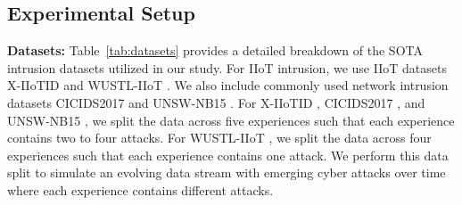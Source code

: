\subsection{Experimental Setup}
\label{section:experimental_setup}
\textbf{Datasets:} Table~\ref{tab:datasets} provides a detailed breakdown of the SOTA intrusion datasets utilized in our study. 
For IIoT intrusion, we use IIoT datasets X-IIoTID \cite{al2021x} and WUSTL-IIoT \cite{zolanvari2021wustl}. We also include commonly used network intrusion datasets CICIDS2017 \cite{Sharafaldin2018TowardGA} and UNSW-NB15 \cite{moustafa2015unsw}. For X-IIoTID \cite{al2021x}, CICIDS2017 \cite{Sharafaldin2018TowardGA}, and UNSW-NB15 \cite{moustafa2015unsw}, we split the data across five experiences such that each experience contains two to four attacks. For WUSTL-IIoT \cite{zolanvari2021wustl}, we split the data across four experiences such that each experience contains one attack. We perform this data split to simulate an evolving data stream with emerging cyber attacks over time where each experience contains different attacks. 


